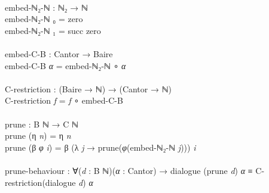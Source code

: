 \documentclass{entcs} \usepackage{prentcsmacro}
\newcommand{\AgdaFontStyle}[1]{\textsf{#1}}
\newcommand{\AgdaBoundFontStyle}[1]{\textit{#1}}
\newcommand{\AgdaSymbol}      [1]{\textcolor{AgdaSymbol}{#1}}
\newcommand{\AgdaBound}    [1]{\AgdaBoundFontStyle{\textcolor{AgdaBound}{#1}}}
\newcommand{\AgdaInductiveConstructor}[1]
    {\AgdaFontStyle{\textcolor{AgdaInductiveConstructor}{#1}}}
\newcommand{\AgdaDatatype} [1]{\AgdaFontStyle{\textcolor{AgdaDatatype}{#1}}}
\newcommand{\AgdaFunction} [1]{\AgdaFontStyle{\textcolor{AgdaFunction}{#1}}}
\newcommand{\AgdaIndent}[1]{\quad}
\newcommand{\AgdaCodeStyle}{\small}
\newenvironment{code}%
{\noindent\AgdaCodeStyle\pboxed}%
{\endpboxed\par\noindent%
\ignorespacesafterend}
\begin{document}
\begin{code}\>\<%
\\
\>\AgdaFunction{embed-ℕ₂-ℕ} \AgdaSymbol{:} \AgdaDatatype{ℕ₂} \AgdaSymbol{→} \AgdaDatatype{ℕ}\<%
\\
\>\AgdaFunction{embed-ℕ₂-ℕ} \AgdaInductiveConstructor{₀} \AgdaSymbol{=} \AgdaInductiveConstructor{zero}\<%
\\
\>\AgdaFunction{embed-ℕ₂-ℕ} \AgdaInductiveConstructor{₁} \AgdaSymbol{=} \AgdaInductiveConstructor{succ} \AgdaInductiveConstructor{zero}\<%
\\
%
\\
\>\AgdaFunction{embed-C-B} \AgdaSymbol{:} \AgdaFunction{Cantor} \AgdaSymbol{→} \AgdaFunction{Baire}\<%
\\
\>\AgdaFunction{embed-C-B} \AgdaBound{α} \AgdaSymbol{=} \AgdaFunction{embed-ℕ₂-ℕ} \AgdaFunction{∘} \AgdaBound{α} \<[29]%
\>[29]\<%
\\
\>[5]\AgdaIndent{1}{}\<[1]%
\>[1]\<%
\\
\>\AgdaFunction{C-restriction} \AgdaSymbol{:} \AgdaSymbol{(}\AgdaFunction{Baire} \AgdaSymbol{→} \AgdaDatatype{ℕ}\AgdaSymbol{)} \AgdaSymbol{→} \AgdaSymbol{(}\AgdaFunction{Cantor} \AgdaSymbol{→} \AgdaDatatype{ℕ}\AgdaSymbol{)}\<%
\\
\>\AgdaFunction{C-restriction} \AgdaBound{f} \AgdaSymbol{=} \AgdaBound{f} \AgdaFunction{∘} \AgdaFunction{embed-C-B}\<%
\\
%
\\
\>\AgdaFunction{prune} \AgdaSymbol{:} \AgdaFunction{B} \AgdaDatatype{ℕ} \AgdaSymbol{→} \AgdaFunction{C} \AgdaDatatype{ℕ}\<%
\\
\>\AgdaFunction{prune} \AgdaSymbol{(}\AgdaInductiveConstructor{η} \AgdaBound{n}\AgdaSymbol{)} \AgdaSymbol{=} \AgdaInductiveConstructor{η} \AgdaBound{n}\<%
\\
\>\AgdaFunction{prune} \AgdaSymbol{(}\AgdaInductiveConstructor{β} \AgdaBound{φ} \AgdaBound{i}\AgdaSymbol{)} \AgdaSymbol{=} \AgdaInductiveConstructor{β} \AgdaSymbol{(λ} \AgdaBound{j} \AgdaSymbol{→} \AgdaFunction{prune}\AgdaSymbol{(}\AgdaBound{φ}\AgdaSymbol{(}\AgdaFunction{embed-ℕ₂-ℕ} \AgdaBound{j}\AgdaSymbol{)))} \AgdaBound{i}\<%
\\
%
\\
\>\AgdaFunction{prune-behaviour} \AgdaSymbol{:} \AgdaSymbol{∀(}\AgdaBound{d} \AgdaSymbol{:} \AgdaFunction{B} \AgdaDatatype{ℕ}\AgdaSymbol{)(}\AgdaBound{α} \AgdaSymbol{:} \AgdaFunction{Cantor}\AgdaSymbol{)} \AgdaSymbol{→} \AgdaFunction{dialogue} \AgdaSymbol{(}\AgdaFunction{prune} \AgdaBound{d}\AgdaSymbol{)} \AgdaBound{α} \AgdaDatatype{≡} \AgdaFunction{C-restriction}\AgdaSymbol{(}\AgdaFunction{dialogue} \AgdaBound{d}\AgdaSymbol{)} \AgdaBound{α} \<[94]%

\end{code}
\end{document}
